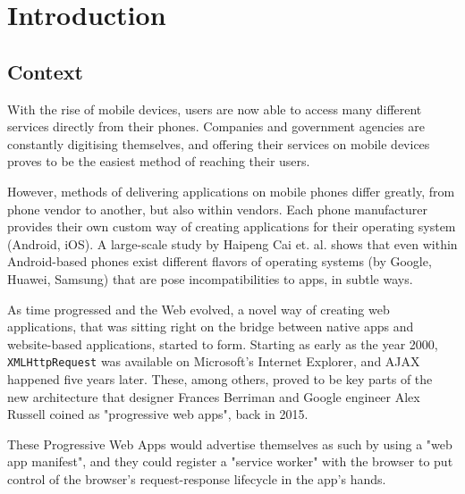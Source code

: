 \chapter{Introduction}


\section{Context}

With the rise of mobile devices, users are now able to access many different services directly from their phones. Companies and government agencies are constantly digitising themselves, and offering their services on mobile devices proves to be the easiest method of reaching their users.

However, methods of delivering applications on mobile phones differ greatly, from phone vendor to another, but also within vendors. Each phone manufacturer provides their own custom way of creating applications for their operating system (Android, iOS). A large-scale study by Haipeng Cai et. al. shows \cite{HaipengAndroidIncomp} that even within Android-based phones exist different flavors of operating systems (by Google, Huawei, Samsung) that are pose incompatibilities to apps, in subtle ways.

As time progressed and the Web evolved, a novel way of creating web applications, that was sitting right on the bridge between native apps and website-based applications, started to form. Starting as early as the year 2000, \verb|XMLHttpRequest| was available on Microsoft's Internet Explorer, and AJAX happened five years later. These, among others, proved to be key parts of the new architecture that designer Frances Berriman and Google engineer Alex Russell coined as "progressive web apps", back in 2015. \cite{PWAShortHist}

These Progressive Web Apps would advertise themselves as such by using a "web app manifest", and they could register a "service worker" with the browser to put control of the browser's request-response lifecycle in the app's hands. \cite{WHATWGWorkers}

